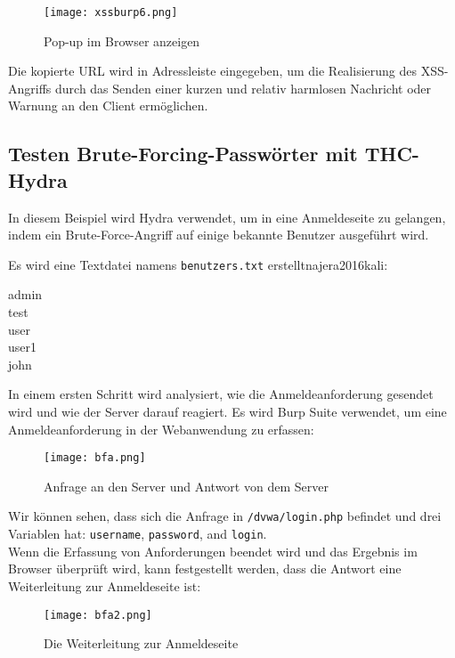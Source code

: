 \newpage

\begin{figure}[h]
	\centering
	\texttt{[image: xssburp6.png]}
	\caption{Pop-up im Browser anzeigen}
\end{figure}

Die kopierte URL wird in Adressleiste eingegeben, um die Realisierung des XSS-Angriffs durch das Senden einer kurzen und relativ harmlosen Nachricht oder Warnung an den Client ermöglichen.

\subsection{Testen Brute-Forcing-Passwörter mit THC-Hydra}

In diesem Beispiel wird Hydra verwendet, um in eine Anmeldeseite zu gelangen, indem ein Brute-Force-Angriff auf einige bekannte Benutzer ausgeführt wird\cite[143]{najera2016kali}.

Es wird eine Textdatei namens \texttt{benutzers.txt} erstellt{najera2016kali}:

\begin{center}
	admin\\test\\user\\user1\\john
\end{center}

In einem ersten Schritt wird analysiert, wie die Anmeldeanforderung gesendet wird und wie der Server darauf reagiert. Es wird Burp Suite verwendet, um eine Anmeldeanforderung in der Webanwendung zu erfassen\cite[144]{najera2016kali}:

\newpage

\begin{figure}[h]
	\centering
	\texttt{[image: bfa.png]}
	\caption{Anfrage an den Server und Antwort von dem Server}
\end{figure}

Wir können sehen, dass sich die Anfrage in \texttt{/dvwa/login.php} befindet und drei Variablen hat: \texttt{username}, \texttt{password}, and \texttt{login}.\\

Wenn die Erfassung von Anforderungen beendet wird und das Ergebnis im Browser überprüft wird, kann festgestellt werden, dass die Antwort eine Weiterleitung zur Anmeldeseite ist\cite[144]{najera2016kali}:

\begin{figure}[h]
	\centering
	\texttt{[image: bfa2.png]}
	\caption{Die Weiterleitung zur Anmeldeseite}
\end{figure}

